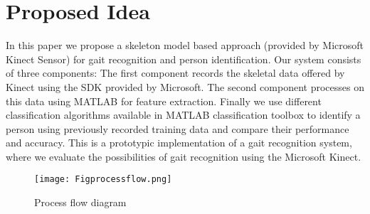 \section{Proposed Idea} \label{Proposed Idea}
\noindent In this paper we propose a skeleton model based approach (provided by Microsoft Kinect Sensor) for gait recognition and person identification. Our system consists of three components: The first component records the skeletal data offered by Kinect using the SDK provided by Microsoft. The second component processes on this data using MATLAB for feature extraction. Finally we use different classification algorithms available in MATLAB classification toolbox to identify a person using previously recorded training data and compare their performance and accuracy. This is a prototypic implementation of a gait recognition system, where we evaluate the possibilities of gait recognition using the Microsoft Kinect.



\begin{figure}[H]
{\texttt{[image: Figprocessflow.png]}}
\caption{Process flow diagram}
\end{figure}

